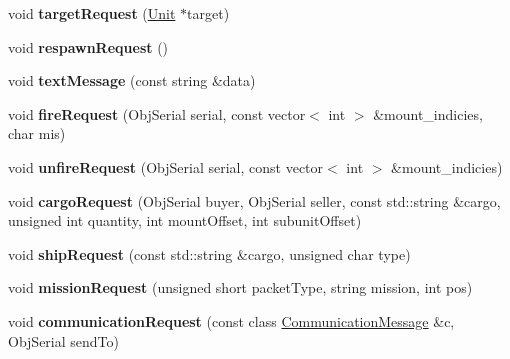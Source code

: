 \begin{DoxyCompactItemize}
\item 
void {\bfseries target\+Request} (\hyperlink{classUnit}{Unit} $\ast$target)\hypertarget{classNetClient_a74b57bd60250c45b9a3ab79a3572b1dd}{}\label{classNetClient_a74b57bd60250c45b9a3ab79a3572b1dd}

\item 
void {\bfseries respawn\+Request} ()\hypertarget{classNetClient_abd796469c946e1648c5b8c04e63b20dc}{}\label{classNetClient_abd796469c946e1648c5b8c04e63b20dc}

\item 
void {\bfseries text\+Message} (const string \&data)\hypertarget{classNetClient_accb8afb590ea5b2053e61992ae02c841}{}\label{classNetClient_accb8afb590ea5b2053e61992ae02c841}

\item 
void {\bfseries fire\+Request} (Obj\+Serial serial, const vector$<$ int $>$ \&mount\+\_\+indicies, char mis)\hypertarget{classNetClient_a79838b1c1a72ce48fbda6f1b9545c7f8}{}\label{classNetClient_a79838b1c1a72ce48fbda6f1b9545c7f8}

\item 
void {\bfseries unfire\+Request} (Obj\+Serial serial, const vector$<$ int $>$ \&mount\+\_\+indicies)\hypertarget{classNetClient_a54dac6eaa212e479df7b093a6560ef3e}{}\label{classNetClient_a54dac6eaa212e479df7b093a6560ef3e}

\item 
void {\bfseries cargo\+Request} (Obj\+Serial buyer, Obj\+Serial seller, const std\+::string \&cargo, unsigned int quantity, int mount\+Offset, int subunit\+Offset)\hypertarget{classNetClient_a7eb879bca19448af7105c58eac36912b}{}\label{classNetClient_a7eb879bca19448af7105c58eac36912b}

\item 
void {\bfseries ship\+Request} (const std\+::string \&cargo, unsigned char type)\hypertarget{classNetClient_a8929bf727be35d8b5dd489893ef8ce40}{}\label{classNetClient_a8929bf727be35d8b5dd489893ef8ce40}

\item 
void {\bfseries mission\+Request} (unsigned short packet\+Type, string mission, int pos)\hypertarget{classNetClient_a06567174e08b2bf39912823561d7ecb3}{}\label{classNetClient_a06567174e08b2bf39912823561d7ecb3}

\item 
void {\bfseries communication\+Request} (const class \hyperlink{classCommunicationMessage}{Communication\+Message} \&c, Obj\+Serial send\+To)\hypertarget{classNetClient_ada3ff6bbdeb4a93bb799767d7b607386}{}\label{classNetClient_ada3ff6bbdeb4a93bb799767d7b607386}


\end{DoxyCompactItemize}
